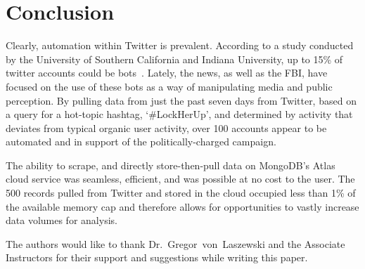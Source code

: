 \section{Conclusion}

Clearly, automation within Twitter is prevalent. According to a study conducted
by the University of Southern California and Indiana University, up to 15\% of
twitter accounts could be bots~\cite{USCIUBotStudy}. Lately, the news, as well
as the FBI, have focused on the use of these bots as a way of manipulating
media and public perception. By pulling data from just the past seven days from
Twitter, based on a query for a hot-topic hashtag, `\#LockHerUp', and
determined by activity that deviates from typical organic user activity, over
100 accounts appear to be automated and in support of the politically-charged
campaign.

The ability to scrape, and directly store-then-pull data on MongoDB's Atlas
cloud service was seamless, efficient, and was possible at no cost to the user.
The 500 records pulled from Twitter and stored in the cloud occupied less than
1\% of the available memory cap and therefore allows for opportunities to
vastly increase data volumes for analysis. 

\begin{acks}

  The authors would like to thank Dr.~Gregor~von~Laszewski and the Associate
Instructors for their support and suggestions while writing this paper.

\end{acks}


 
